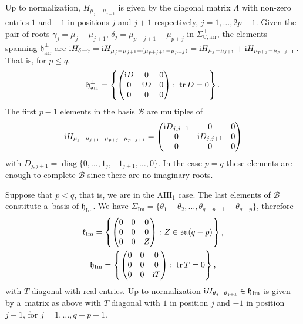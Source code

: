 \documentclass[pdftex]{sigma}
\numberwithin{equation}{section}
\newcommand{\func}[1]{\operatorname{#1}}
\begin{document}
Up to normalization, $H_{\mu _{j}-\mu _{j+1}}$ is given by the diagonal matrix $\Lambda $ with non-zero entries $1$ and $-1$ in positions $j$ and $j+1$ respectively, $j=1, \ldots,2p-1$. Given the pair of roots $%
\gamma_j=\mu_j-\mu_{j+1}$, $\delta_j=\mu_{p+j+1}-\mu_{p+j}$ in $\Sigma _{\mathbb{C},\mathrm{arr}}^\bot$, the elements spanning $\mathfrak{h }_{\mathrm{arr}}^\bot$ are ${\rm i}H_{\delta-\gamma}={\rm i} H_{\mu _{j}-\mu _{j+1}-(\mu_{p+j+1}-\mu _{p+j})}={\rm i}H_{\mu _{j}-\mu _{j+1}}+{\rm i}H_{\mu _{p+j}-\mu _{p+j+1}}$. That is, for $p\leq q$,
\begin{gather}
\mathfrak{h}_{\mathrm{arr}}^{\bot }=\left\{\left(
\begin{matrix}
{\rm i}D & 0 & 0 \\
0 & {\rm i}D & 0 \\
0 & 0 & 0
\end{matrix}
\right)\colon \operatorname{tr}D=0\right\}. \label{formatrizhortogonal}
\end{gather}
The first $p-1$ elements in the basis $\mathcal{B}$ are multiples
of
\begin{gather*}
{\rm i}H_{\mu _{j}-\mu _{j+1}+\mu _{p+j}-\mu _{p+j+1}}=\left(
\begin{matrix}
{\rm i}D_{j,j+1} & 0 & 0 \\
0 & {\rm i}D_{j,j+1} & 0 \\
0 & 0 & 0
\end{matrix}
\right)
\end{gather*}
with $D_{j,j+1}=\operatorname{diag}\{0,\ldots,1_{j},-1_{j+1},\ldots,0\}$. In the case $p=q$ these elements are enough to complete $\mathcal{B}$ since there are no imaginary roots.

Suppose that $p<q$, that is, we are in the $\mathrm{AIII}_{1}$ case. The last elements of $\mathcal{B}$ constitute a~basis of $\mathfrak{h }_{\mathrm{Im}}$. We have $\Sigma_{\func{Im}} =\{\theta_1-\theta_2,\ldots,\theta_{q-p-1}-\theta_{q-p}\}$, therefore
\begin{gather*}
\mathfrak{k}_{\func{Im}} = \left\{\left(
\begin{matrix}
0 & 0 & 0 \\
0 & 0 & 0 \\
0 & 0 & Z
\end{matrix}
\right)\colon Z\in \mathfrak{su}(q-p) \right\}, \\
\mathfrak{h}_{\func{Im}} = \left\{\left(
\begin{matrix}
0 & 0 & 0 \\
0 & 0 & 0 \\
0 & 0 & {\rm i}T
\end{matrix}
\right)\colon \operatorname{tr}T=0 \right\},
\end{gather*}
with $T$ diagonal with real entries. Up to normalization ${\rm i}H_{\theta_j-\theta_{j+1}}\in \mathfrak{h }_{\mathrm{Im}}$ is given by a~matrix as above with $T$ diagonal with $1$ in position $j$ and $-1$ in position $j+1$, for $j=1, \ldots,q-p-1$.
\end{document}
